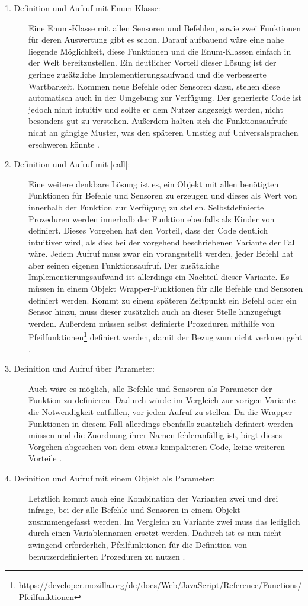 \begin{description}
  \item[1. Definition und Aufruf mit Enum-Klasse:] Eine Enum-Klasse mit allen Sensoren und Befehlen, sowie zwei Funktionen für deren Auswertung gibt es schon. Darauf aufbauend wäre eine nahe liegende Möglichkeit, diese Funktionen und die Enum-Klassen einfach in der Welt bereitzustellen. Ein deutlicher Vorteil dieser Lösung ist der geringe zusätzliche Implementierungsaufwand und die verbesserte Wartbarkeit. Kommen neue Befehle oder Sensoren dazu, stehen diese automatisch auch in der Umgebung zur Verfügung. Der generierte Code ist jedoch nicht intuitiv und sollte er dem Nutzer angezeigt werden, nicht besonders gut zu verstehen. Außerdem halten sich die Funktionsaufrufe nicht an gängige Muster, was den späteren Umstieg auf Universalsprachen erschweren könnte .
  \item[2. Definition und Aufruf mit \inlinec|call|:] Eine weitere denkbare Lösung ist es, ein Objekt mit allen benötigten Funktionen für Befehle und Sensoren zu erzeugen und dieses als Wert von  innerhalb der Funktion zur Verfügung zu stellen. Selbstdefinierte Prozeduren werden innerhalb der Funktion ebenfalls als Kinder von  definiert. Dieses Vorgehen hat den Vorteil, dass der Code deutlich intuitiver wird, als dies bei der vorgehend beschriebenen Variante der Fall wäre. Jedem Aufruf muss zwar ein  vorangestellt werden, jeder Befehl hat aber seinen eigenen Funktionsaufruf. Der zusätzliche Implementierungsaufwand ist allerdings ein Nachteil dieser Variante. Es müssen in einem Objekt Wrapper-Funktionen für alle Befehle und Sensoren definiert werden. Kommt zu einem späteren Zeitpunkt ein Befehl oder ein Sensor hinzu, muss dieser zusätzlich auch an dieser Stelle hinzugefügt werden. Außerdem müssen selbst definierte Prozeduren mithilfe von Pfeilfunktionen\footnote{\url{https://developer.mozilla.org/de/docs/Web/JavaScript/Reference/Functions/Pfeilfunktionen}} definiert werden, damit der Bezug zum  nicht verloren geht .
  \item[3. Definition und Aufruf über Parameter:] Auch wäre es möglich, alle Befehle und Sensoren als Parameter der Funktion zu definieren. Dadurch würde im Vergleich zur vorigen Variante die Notwendigkeit entfallen,  vor jeden Aufruf zu stellen. Da die Wrapper-Funktionen in diesem Fall allerdings ebenfalls zusätzlich definiert werden müssen und die Zuordnung ihrer Namen fehleranfällig ist, birgt dieses Vorgehen abgesehen von dem etwas kompakteren Code, keine weiteren Vorteile .
  \item[4. Definition und Aufruf mit einem Objekt als Parameter:] Letztlich kommt auch eine Kombination der Varianten zwei und drei infrage, bei der alle Befehle und Sensoren in einem Objekt zusammengefasst werden. Im Vergleich zu Variante zwei muss das  lediglich durch einen Variablennamen ersetzt werden. Dadurch ist es nun nicht zwingend erforderlich, Pfeilfunktionen für die Definition von benutzerdefinierten Prozeduren zu nutzen .
\end{description}

